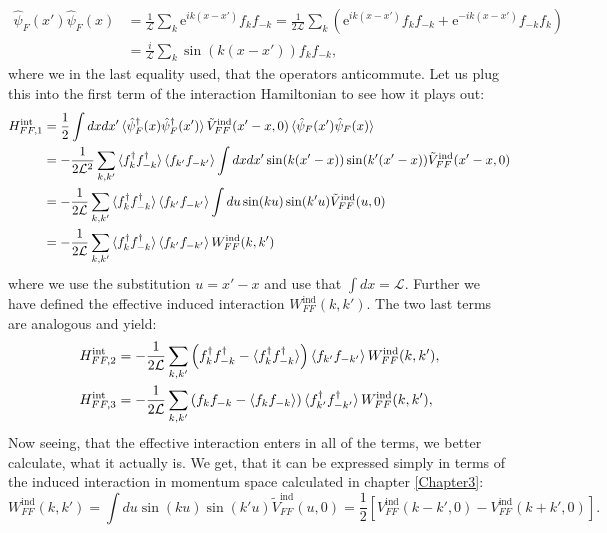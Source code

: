 \begin{align}
\hat{\psi}_F(x') \hat{\psi}_F(x) &= \frac{1}{\mathcal{L}}\sum_{k} \text{e}^{ik(x-x')}f_kf_{-k} = \frac{1}{2\mathcal{L}}\sum_{k} \left(\text{e}^{ik(x-x')}f_{k}f_{-k}+\text{e}^{-ik(x-x')}f_{-k}f_{k}\right) \nonumber \\
&= \frac{i}{\mathcal{L}}\sum_{k} \sin(k(x-x'))f_{k}f_{-k}, 
\label{eq.correlation}
\end{align}
where we in the last equality used, that the operators anticommute. Let us plug this into the first term of the interaction Hamiltonian to see how it plays out: 
\begin{align}
H^\text{int}_{FF,1} &= \frac{1}{2}\int dxdx' \braket {\hat{\psi}^\dagger_F(x) \hat{\psi}^\dagger_F(x')} \tilde{V}^\text{ind}_{FF}(x'-x,0) \braket {\hat{\psi}_F(x') \hat{\psi}_F(x)} \nonumber \\
&= - \frac{1}{2\mathcal{L}^2}\sum_{k,k'} \braket {f^\dagger_{k}f^\dagger_{-k} } \braket {f_{k'}f_{-k'}} \int dx dx' \sin(k(x'-x))\sin(k'(x'-x))\tilde{V}^\text{ind}_{FF}(x'-x,0) \nonumber \\
&= - \frac{1}{2\mathcal{L}}\sum_{k,k'} \braket {f^\dagger_{k}f^\dagger_{-k}} \braket{f_{k'}f_{-k'}} \int du \sin(ku)\sin(k'u)\tilde{V}^\text{ind}_{FF}(u,0) \nonumber \\
&= - \frac{1}{2\mathcal{L}}\sum_{k,k'} \braket {f^\dagger_{k}f^\dagger_{-k}} \braket {f_{k'}f_{-k'}} W^\text{ind}_{FF}(k,k')
\end{align}
where we use the substitution $u = x'-x$ and use that $\int dx = \mathcal{L}$. Further we have defined the effective induced interaction $W^\text{ind}_{FF}(k,k')$. The two last terms are analogous and yield:
\begin{align}
H^\text{int}_{FF,2} &= - \frac{1}{2\mathcal{L}}\sum_{k,k'}\left(f^\dagger_k f^\dagger_{-k} - \braket {f^\dagger_k f^\dagger_{-k}}\right) \braket {f_{k'}f_{-k'}} W^\text{ind}_{FF}(k,k'), \nonumber \\
H^\text{int}_{FF,3} &= - \frac{1}{2\mathcal{L}}\sum_{k,k'}\left(f_k f_{-k} - \braket{f_k f_{-k}} \right)\braket {f^\dagger_{k'}f^\dagger_{-k'} } W^\text{ind}_{FF}(k,k'), \nonumber
\end{align}
Now seeing, that the effective interaction enters in all of the terms, we better calculate, what it actually is. We get, that it can be expressed simply in terms of the induced interaction in momentum space calculated in chapter \ref{Chapter3}:
\begin{equation}
W^\text{ind}_{FF}(k,k') = \int du \sin(ku)\sin(k'u)\tilde{V}^\text{ind}_{FF}(u,0) = \frac{1}{2}\left[V^\text{ind}_{FF}(k-k',0) - V^\text{ind}_{FF}(k+k',0)\right].
\label{eq.EffectiveInteraction}
\end{equation}
